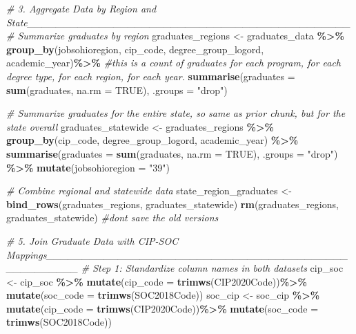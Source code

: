 \documentclass[
]{article}
\newenvironment{Shaded}{\begin{snugshade}}{\end{snugshade}}
\newcommand{\AttributeTok}[1]{\textcolor[rgb]{0.13,0.29,0.53}{#1}}
\newcommand{\CommentTok}[1]{\textcolor[rgb]{0.56,0.35,0.01}{\textit{#1}}}
\newcommand{\ConstantTok}[1]{\textcolor[rgb]{0.56,0.35,0.01}{#1}}
\newcommand{\FunctionTok}[1]{\textcolor[rgb]{0.13,0.29,0.53}{\textbf{#1}}}
\newcommand{\NormalTok}[1]{#1}
\newcommand{\OtherTok}[1]{\textcolor[rgb]{0.56,0.35,0.01}{#1}}
\newcommand{\SpecialCharTok}[1]{\textcolor[rgb]{0.81,0.36,0.00}{\textbf{#1}}}
\newcommand{\StringTok}[1]{\textcolor[rgb]{0.31,0.60,0.02}{#1}}
\begin{document}
\begin{Shaded}
\begin{Highlighting}[]
\CommentTok{\# 3. Aggregate Data by Region and State\_\_\_\_\_\_\_\_\_\_\_\_\_\_\_\_\_\_\_\_\_\_\_\_\_\_\_\_\_\_\_\_\_\_\_\_\_\_\_\_\_\_\_\_\_}
\CommentTok{\# Summarize graduates by region}
\NormalTok{graduates\_regions }\OtherTok{\textless{}{-}}\NormalTok{ graduates\_data }\SpecialCharTok{\%\textgreater{}\%}
  \FunctionTok{group\_by}\NormalTok{(jobsohioregion, cip\_code, degree\_group\_logord, academic\_year)}\SpecialCharTok{\%\textgreater{}\%}
  \CommentTok{\#this is a count of graduates for each program, for each degree type, for each region, for each year.}
  \FunctionTok{summarise}\NormalTok{(}\AttributeTok{graduates =} \FunctionTok{sum}\NormalTok{(graduates, }\AttributeTok{na.rm =} \ConstantTok{TRUE}\NormalTok{), }\AttributeTok{.groups =} \StringTok{"drop"}\NormalTok{)}

\CommentTok{\# Summarize graduates for the entire state, so same as prior chunk, but for the state overall}
\NormalTok{graduates\_statewide }\OtherTok{\textless{}{-}}\NormalTok{ graduates\_regions }\SpecialCharTok{\%\textgreater{}\%}
  \FunctionTok{group\_by}\NormalTok{(cip\_code, degree\_group\_logord, academic\_year) }\SpecialCharTok{\%\textgreater{}\%}
  \FunctionTok{summarise}\NormalTok{(}\AttributeTok{graduates =} \FunctionTok{sum}\NormalTok{(graduates, }\AttributeTok{na.rm =} \ConstantTok{TRUE}\NormalTok{), }\AttributeTok{.groups =} \StringTok{"drop"}\NormalTok{) }\SpecialCharTok{\%\textgreater{}\%}
  \FunctionTok{mutate}\NormalTok{(}\AttributeTok{jobsohioregion =} \StringTok{"39"}\NormalTok{)}

\CommentTok{\# Combine regional and statewide data}
\NormalTok{state\_region\_graduates }\OtherTok{\textless{}{-}} \FunctionTok{bind\_rows}\NormalTok{(graduates\_regions, graduates\_statewide)}
\FunctionTok{rm}\NormalTok{(graduates\_regions, graduates\_statewide) }\CommentTok{\#don\textquotesingle{}t save the old versions}


\CommentTok{\# 5. Join Graduate Data with CIP{-}SOC Mappings\_\_\_\_\_\_\_\_\_\_\_\_\_\_\_\_\_\_\_\_\_\_\_\_\_\_\_\_\_\_\_\_\_\_\_\_\_\_\_\_\_\_\_\_\_\_\_\_\_\_\_\_}
\CommentTok{\# Step 1: Standardize column names in both datasets}
\NormalTok{cip\_soc }\OtherTok{\textless{}{-}}\NormalTok{ cip\_soc }\SpecialCharTok{\%\textgreater{}\%}
  \FunctionTok{mutate}\NormalTok{(}\AttributeTok{cip\_code =} \FunctionTok{trimws}\NormalTok{(CIP2020Code))}\SpecialCharTok{\%\textgreater{}\%}
  \FunctionTok{mutate}\NormalTok{(}\AttributeTok{soc\_code =} \FunctionTok{trimws}\NormalTok{(SOC2018Code))}
\NormalTok{soc\_cip }\OtherTok{\textless{}{-}}\NormalTok{ soc\_cip }\SpecialCharTok{\%\textgreater{}\%}
  \FunctionTok{mutate}\NormalTok{(}\AttributeTok{cip\_code =} \FunctionTok{trimws}\NormalTok{(CIP2020Code))}\SpecialCharTok{\%\textgreater{}\%}
  \FunctionTok{mutate}\NormalTok{(}\AttributeTok{soc\_code =} \FunctionTok{trimws}\NormalTok{(SOC2018Code))}


\end{Highlighting}
\end{Shaded}
\end{document}
